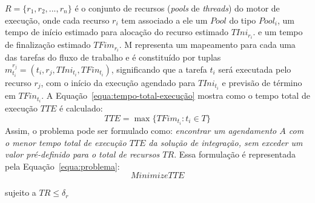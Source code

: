 \documentclass[sigconf]{acmart}
\begin{document}
 $R = \{ {r_1},{r_2},...,{r_n}\}$  é o conjunto de recursos (\emph{pools} de \emph{threads}) do motor de execução, onde cada recurso $r_i$ tem associado a ele um $Pool$ do tipo $Pool_i$, um tempo de início estimado para alocação do recurso estimado ${TIni_{r_i}}$. e um tempo de finalização estimado ${TFim_{r_i}}$. M representa um mapeamento para cada uma das tarefas do fluxo de trabalho e é constituído por tuplas $ m_{{t_i}}^{{r_j}} = ({t_i},{r_j},TIn{i_{{t_i}}},TFi{n_{{t_i}}})$, significando que a tarefa $t_i$ será executada pelo recurso $r_j$, com o início da execução agendado para $ TIn{i_{{t_i}}} $ e previsão de término em $ TFi{n_{{t_i}}} $. A Equação~\ref{equa:tempo-total-execução} mostra como o tempo total de execução $ TTE $ é calculado:
 \begin{equation}
 TTE = \max \{ TFi{m_{{t_i}}}:{t_i} \in T\} 
 \label{equa:tempo-total-execução}
 \end{equation}
 Assim, o problema pode ser formulado como: \textit{encontrar um agendamento $A$ com o menor tempo total de execução $TTE$ da solução de integração, sem exceder um valor pré-definido para o total de recursos $TR$}. Essa formulação é representada pela Equação~\ref{equa:problema}:
 \begin{equation}
 Minimize {TTE} 
 \label{equa:problema}
 \end{equation}
 \begin{center}
 	sujeito a ${TR \le {\delta _r}} $
 \end{center}
% 	
\end{document}
